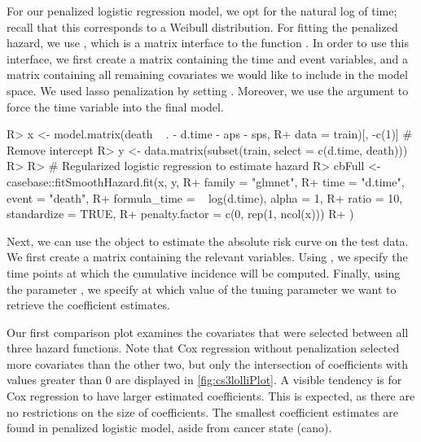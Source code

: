 \documentclass[
]{jss}
\begin{document}
For our penalized logistic regression model, we opt for the natural log
of time; recall that this corresponds to a Weibull distribution. For
fitting the penalized hazard, we use , which
is a matrix interface to the function . In order
to use this interface, we first create a matrix  containing the
time and event variables, and a matrix  containing all remaining
covariates we would like to include in the model space. We used lasso
penalization by setting . Moreover, we use the argument
 to force the time variable into the final model.

\begin{CodeChunk}

\begin{CodeInput}
R> x <- model.matrix(death ~ . - d.time - aps - sps, 
R+                   data = train)[, -c(1)] # Remove intercept
R> y <- data.matrix(subset(train, select = c(d.time, death)))
R> 
R> # Regularized logistic regression to estimate hazard
R> cbFull <- casebase::fitSmoothHazard.fit(x, y,
R+   family = "glmnet",
R+   time = "d.time", event = "death",
R+   formula_time = ~ log(d.time), alpha = 1,
R+   ratio = 10, standardize = TRUE,
R+   penalty.factor = c(0, rep(1, ncol(x)))
R+ )
\end{CodeInput}
\end{CodeChunk}

Next, we can use the object  to estimate the absolute risk
curve on the test data. We first create a matrix  containing
the relevant variables. Using , we specify the time points
at which the cumulative incidence will be computed. Finally, using the
parameter , we specify at which value of the
tuning parameter we want to retrieve the coefficient estimates.

\begin{CodeChunk}

\end{CodeChunk}

Our first comparison plot examines the covariates that were selected
between all three hazard functions. Note that Cox regression without
penalization selected more covariates than the other two, but only the
intersection of coefficients with values greater than 0 are displayed in
\ref{fig:cs3lolliPlot}. A visible tendency is for Cox regression to have
larger estimated coefficients. This is expected, as there are no
restrictions on the size of coefficients. The smallest coefficient
estimates are found in penalized logistic model, aside from cancer state
(cano).
\end{document}
